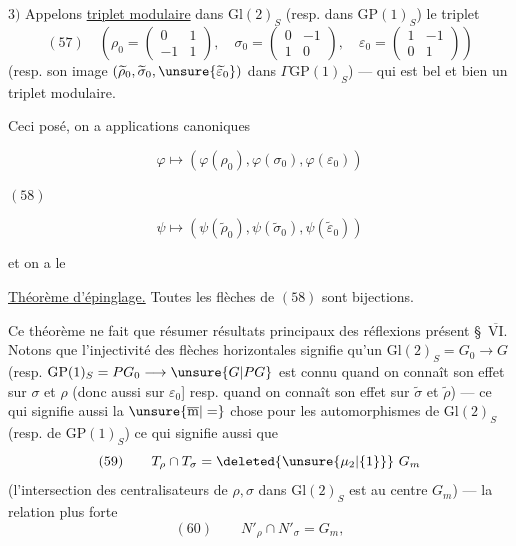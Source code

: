  $3)$ Appelons \uline{triplet modulaire}
\uline{} dans $\mathrm{Gl}(2)_S$
(resp. dans $\mathrm{GP}(1)_S$) le triplet
\[
(57)\quad\left(\rho_0=\begin{pmatrix}0&1\\-1&1\end{pmatrix},\quad
\sigma_0=\begin{pmatrix}0&-1\\1&0\end{pmatrix},\quad
\varepsilon_0=\begin{pmatrix}1&-1\\0&1\end{pmatrix}\right)
\]
(resp. son image $(\widetilde\rho_0,\widetilde\sigma_0,
\unsure{\widetilde\varepsilon_0})$ dans $\Gamma\mathrm{GP}(1)_S$) ---
qui est bel et bien un triplet modulaire.

Ceci posé, on a applications
canoniques


\[
\varphi\longmapsto(\varphi(\rho_0),\varphi(\sigma_0),\varphi(\varepsilon_0))
\]

\begin{samepage}
$(58)$
\end{samepage}
\[
\psi\longmapsto(\psi(\widetilde\rho_0),\psi(\widetilde\sigma_0),
\psi(\widetilde\varepsilon_0))
\]

et on a le

\uline{Théorème d'épinglage.} Toutes les flèches de $(58)$ sont bijections.

Ce théorème ne fait que résumer 
 résultats principaux des réflexions
 présent \S\ \uline{$\overline{\mathrm{VI}}$}.
Notons que l'injectivité des flèches horizontales signifie 
qu'un 
$\mathrm{Gl}(2)_S=G_0\longrightarrow G$
(resp. $\mathrm{GP}(1)_S=PG_0\longrightarrow\unsure{G|PG}$
est connu quand on connaît son effet sur $\sigma$ et $\rho$
(donc aussi sur $\varepsilon_0$]
\unsure{$\leftarrow$} resp. quand on connaît son effet sur
$\widetilde\sigma$ et $\widetilde\rho$) --- ce qui signifie aussi
la $\unsure{\overline{\mathrm m}|=}$ chose pour les automorphismes de
$\mathrm{Gl}(2)_S$ (resp. de $\mathrm{GP}(1)_S$)
ce qui signifie aussi que
\[
(59)\qquad T_\rho\cap T_\sigma=\deleted{\unsure{\mu_2|\{1\}}}\ G_m
\]
(l'intersection des centralisateurs de $\rho,\sigma$ dans
$\mathrm{Gl}(2)_S$ est  au centre $G_m$) ---
 la relation plus forte
\[
(60)\qquad N'_\rho\cap N'_\sigma=G_m,
\]

